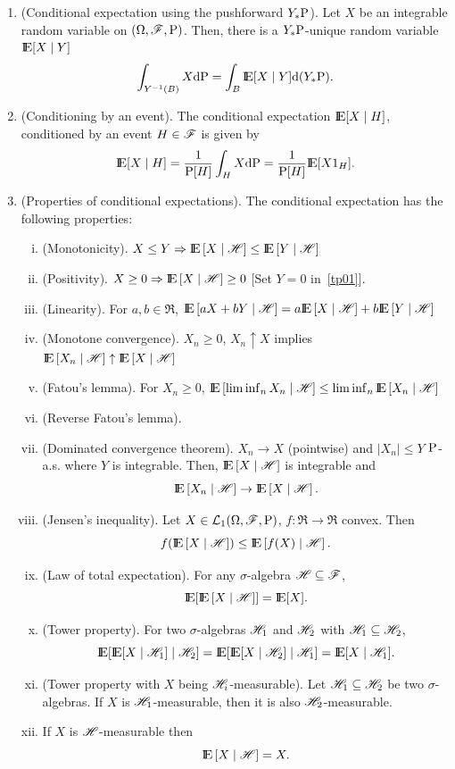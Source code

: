 \documentclass[a4paper,10pt]{article}
\newcommand{\ce}[1]{\E\left[#1 {}\mid{} \HH \right]}
\begin{document}
\begin{enumerate}
 \item (Conditional expectation using the pushforward $Y_*\mathrm{P}$). 
       Let $X$ be an integrable random variable on $(\Omega,\mathscr{F},\mathrm{P})$. Then, there is a $Y_*\mathrm{P}$-unique 
       random variable $\E[X\mid Y]$
       \[
        \int_{Y^{-1}(B)} X\d \prob = \int_B \E[X{}\mid{}Y]\d(Y_*\prob).
       \]

 \item (Conditioning by an event). The conditional expectation $\E[X\mid H]$, conditioned
       by an event $H\in\mathscr{F}$ is given by
       \[
        \E[X\mid H] = \frac{1}{\prob[H]}\int_H X\d\prob = \frac{1}{\prob[H]}\E[X1_H].
       \]

 \item (Properties of conditional expectations). 
       The conditional expectation has the following properties:
       \begin{enumerate}[i.]
	\item \label{tp01} (Monotonicity). $X\leq Y \Rightarrow \ce{X} \leq \ce{Y}$
	\item (Positivity).  $X\geq 0 \Rightarrow \ce{X} \geq 0$ [Set $Y=0$ in~\ref{tp01}]. 
	\item (Linearity). For $a,b\in\Re$, $\ce{aX+bY}=a\ce{X} + b \ce{Y}$
	\item (Monotone convergence). $X_n\geq 0$, $X_n \uparrow X$ implies $\ce{X_n}\uparrow \ce{X}$
	\item (Fatou's lemma). For $X_n\geq 0$, $\ce{\liminf_n X_n}\leq \liminf_n \ce{X_n}$
	\item (Reverse Fatou's lemma).
	\item (Dominated convergence theorem). $X_n\to X$ (pointwise) and $|X_n|\leq Y$ $\mathrm{P}$-a.s. where $Y$ is
	      integrable. Then, $\ce{X}$ is integrable and 
	      \[
	       \ce{X_n} \to \ce{X}.
	      \]
        \item (Jensen's inequality). Let $X\in\mathcal{L}_1(\Omega,\mathscr{F},\mathrm{P})$, $f:\Re\to\Re$ convex. Then
	      \[
	      f(\ce{X})\leq \ce{f(X)}.
	      \]
        \item (Law of total expectation). For any $\sigma$-algebra $\mathscr{H} \subseteq \mathscr{F}$,
	      \[
	       \E[\ce{X}] = \E[X].
	      \]
        \item (Tower property). For two $\sigma$-algebras $\mathscr{H}_1$ and $\mathscr{H}_2$ with $\mathscr{H}_1\subseteq \mathscr{H}_2$,	      
	      \[
	       \E[\E[X {}\mid{} \HH_1] {}\mid{} \HH_2] = \E[\E[X {}\mid{} \HH_2] {}\mid{} \HH_1] = \E[X {}\mid{} \HH_1].
	      \]
        \item (Tower property with $X$ being $\mathscr{H}_i$-measurable). Let $\mathscr{H}_1\subseteq \mathscr{H}_2$ be two $\sigma$-algebras. 
	      If $X$ is $\mathscr{H}_1$-measurable, then it is also $\mathscr{H}_2$-measurable.
	    

        \item If $X$ is $\mathscr{H}$-measurable then
	      \[
	       \ce{X} = X.
	      \]

       \end{enumerate}
\end{enumerate}
\end{document}
